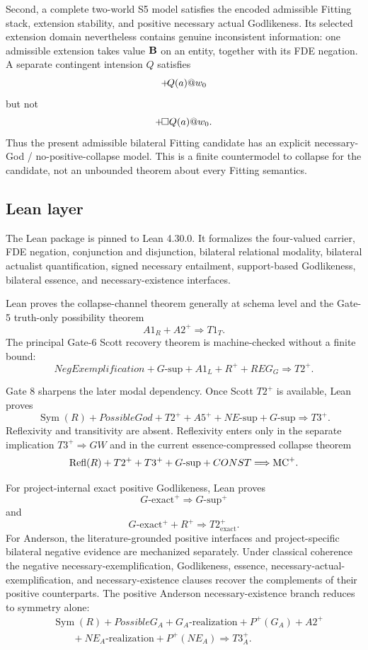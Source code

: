 Second, a complete two-world S5 model satisfies the encoded admissible Fitting stack, extension stability, and positive necessary actual Godlikeness. Its selected extension domain nevertheless contains genuine inconsistent information: one admissible extension takes value \(\mathbf{B}\) on an entity, together with its FDE negation. A separate contingent intension \(Q\) satisfies
\[
  +\!Q(a)@w_0
\]
but not
\[
  +\!\Box Q(a)@w_0.
\]
Thus the present admissible bilateral Fitting candidate has an explicit necessary-God / no-positive-collapse model. This is a finite countermodel to collapse for the candidate, not an unbounded theorem about every Fitting semantics.

\subsection{Lean layer}
\label{sec:lean-layer}

The Lean package is pinned to Lean 4.30.0. It formalizes the four-valued carrier, FDE negation, conjunction and disjunction, bilateral relational modality, bilateral actualist quantification, signed necessary entailment, support-based Godlikeness, bilateral essence, and necessary-existence interfaces.

Lean proves the collapse-channel theorem generally at schema level and the Gate-5 truth-only possibility theorem
\[
  A1_R+A2^+\Longrightarrow T1_T.
\]
The principal Gate-6 Scott recovery theorem is machine-checked without a finite bound:
\[
  NegExemplification
  +G\text{-sup}
  +A1_L
  +R^+
  +REG_G
  \Longrightarrow T2^+.
\]

Gate 8 sharpens the later modal dependency. Once Scott \(T2^+\) is available, Lean proves
\[
  \operatorname{Sym}(R)
  +PossibleGod
  +T2^+
  +A5^+
  +NE\text{-sup}
  +G\text{-sup}
  \Longrightarrow T3^+.
\]
Reflexivity and transitivity are absent. Reflexivity enters only in the separate implication \(T3^+\Rightarrow GW\) and in the current essence-compressed collapse theorem
\[
  \operatorname{Refl}(R)
  +T2^+
  +T3^+
  +G\text{-sup}
  +CONST
  \Longrightarrow\mathrm{MC}^{+}.
\]

For project-internal exact positive Godlikeness, Lean proves
\[
  G\text{-exact}^+\Rightarrow G\text{-sup}^+
\]
and
\[
  G\text{-exact}^+ + R^+\Longrightarrow T2_{\mathrm{exact}}^+.
\]
For Anderson, the literature-grounded positive interfaces and project-specific bilateral negative evidence are mechanized separately. Under classical coherence the negative necessary-exemplification, Godlikeness, essence, necessary-actual-exemplification, and necessary-existence clauses recover the complements of their positive counterparts. The positive Anderson necessary-existence branch reduces to symmetry alone:
\[
\begin{split}
  &\operatorname{Sym}(R)
  +PossibleG_A
  +G_A\text{-realization}
  +P^+(G_A)
  +A2^+\\
  &\qquad
  +NE_A\text{-realization}
  +P^+(NE_A)
  \Longrightarrow T3_A^+.
\end{split}
\]


